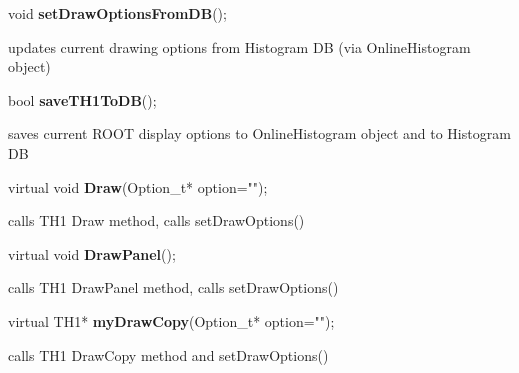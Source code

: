 \item    void {\bf setDrawOptionsFromDB}();


 updates current drawing options from Histogram DB (via OnlineHistogram object)


\item    bool {\bf saveTH1ToDB}();


 saves current ROOT display options to OnlineHistogram object and to Histogram DB


\item    virtual void {\bf Draw}(Option\_t* option="");


 calls TH1 Draw method, calls setDrawOptions()


\item    virtual void {\bf DrawPanel}();


 calls TH1 DrawPanel method, calls setDrawOptions()


\item    virtual TH1* {\bf myDrawCopy}(Option\_t* option="");


 calls TH1 DrawCopy method and setDrawOptions()


